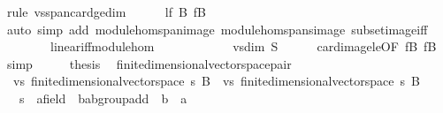 \begin{isabellebody}
\ {\isacharparenleft}{\kern0pt}rule\ vs{}{\isachardot}{\kern0pt}span{\isacharunderscore}{\kern0pt}card{\isacharunderscore}{\kern0pt}ge{\isacharunderscore}{\kern0pt}dim{\isacharparenright}{\kern0pt}\isanewline
\ \ \ \ \isamarkupfalse%
\ lf\ B\ fB\isanewline
\ \ \ \ \ \ \isamarkupfalse%
\ {\isacharparenleft}{\kern0pt}auto\ simp\ add{\isacharcolon}{\kern0pt}\ module{\isacharunderscore}{\kern0pt}hom{\isachardot}{\kern0pt}span{\isacharunderscore}{\kern0pt}image\ module{\isacharunderscore}{\kern0pt}hom{\isachardot}{\kern0pt}spans{\isacharunderscore}{\kern0pt}image\ subset{\isacharunderscore}{\kern0pt}image{\isacharunderscore}{\kern0pt}iff\isanewline
\ \ \ \ \ \ \ \ linear{\isacharunderscore}{\kern0pt}iff{\isacharunderscore}{\kern0pt}module{\isacharunderscore}{\kern0pt}hom{\isacharparenright}{\kern0pt}\isanewline
\ \ \ \ \isamarkupfalse%
\isanewline
\ \ \isamarkupfalse%
\ \isamarkupfalse%
\ {\isachardoublequoteopen}{\isasymdots}\ {\isasymle}\ vs{}{\isachardot}{\kern0pt}dim\ S{\isachardoublequoteclose}\isanewline
\ \ \ \ \isamarkupfalse%
\ card{\isacharunderscore}{\kern0pt}image{\isacharunderscore}{\kern0pt}le{\isacharbrackleft}{\kern0pt}OF\ fB{\isacharparenleft}{\kern0pt}{}{\isacharparenright}{\kern0pt}{\isacharbrackright}{\kern0pt}\ fB\ \isamarkupfalse%
\ simp\isanewline
\ \ \isamarkupfalse%
\ \isamarkupfalse%
\ {\isacharquery}{\kern0pt}thesis\ \isacommand{{\isachardot}{\kern0pt}}\isamarkupfalse%
\isanewline
{}\isamarkupfalse%
%
\endisatagproof
{\isafoldproof}%
%
\isadelimproof
\isanewline
%
\endisadelimproof
\isanewline
{}\isamarkupfalse%
\isanewline
\isanewline
{}\isamarkupfalse%
\ finite{\isacharunderscore}{\kern0pt}dimensional{\isacharunderscore}{\kern0pt}vector{\isacharunderscore}{\kern0pt}space{\isacharunderscore}{\kern0pt}pair\ {\isacharequal}{\kern0pt}\isanewline
\ \ vs{}{\isacharcolon}{\kern0pt}\ finite{\isacharunderscore}{\kern0pt}dimensional{\isacharunderscore}{\kern0pt}vector{\isacharunderscore}{\kern0pt}space\ s{}\ B{}\ {\isacharplus}{\kern0pt}\ vs{}{\isacharcolon}{\kern0pt}\ finite{\isacharunderscore}{\kern0pt}dimensional{\isacharunderscore}{\kern0pt}vector{\isacharunderscore}{\kern0pt}space\ s{}\ B{}\isanewline
\ \ \ s{}\ {\isacharcolon}{\kern0pt}{\isacharcolon}{\kern0pt}\ {\isachardoublequoteopen}{\isacharprime}{\kern0pt}a{\isacharcolon}{\kern0pt}{\isacharcolon}{\kern0pt}field\ {\isasymRightarrow}\ {\isacharprime}{\kern0pt}b{\isacharcolon}{\kern0pt}{\isacharcolon}{\kern0pt}ab{\isacharunderscore}{\kern0pt}group{\isacharunderscore}{\kern0pt}add\ {\isasymRightarrow}\ {\isacharprime}{\kern0pt}b{\isachardoublequoteclose}\ {\isacharparenleft}{\kern0pt}\ {\isachardoublequoteopen}{\isacharasterisk}{\kern0pt}a{\isachardoublequoteclose}\ {}{}{\isacharparenright}{\kern0pt}\isanewline

\end{isabellebody}
